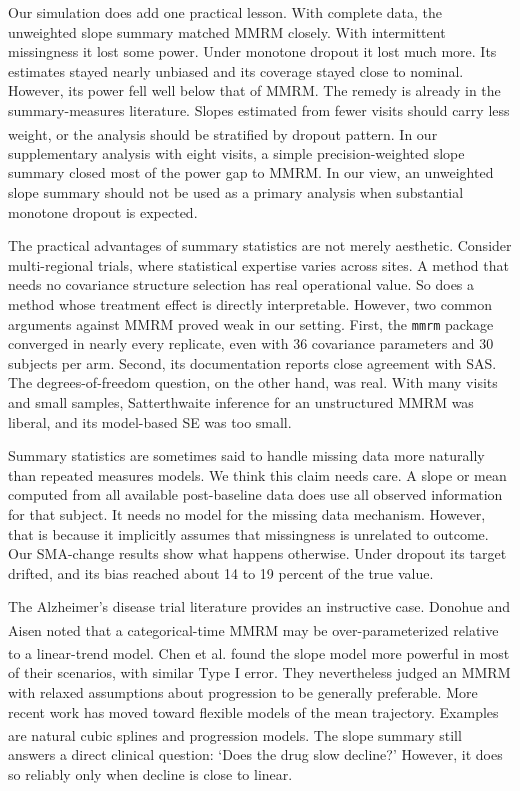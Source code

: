 \documentclass[
  11pt,
]{article}
\begin{document}
Our simulation does add one practical lesson. With complete
data, the unweighted slope summary matched MMRM closely. With
intermittent missingness it lost some power. Under monotone
dropout it lost much more. Its
estimates stayed nearly unbiased and its coverage stayed close
to nominal. However, its power fell well below that of MMRM.
The remedy is already in the summary-measures literature.
Slopes estimated from fewer visits should carry less weight,
or the analysis should be stratified by dropout pattern\textsuperscript{}. In our
supplementary analysis with eight visits, a simple
precision-weighted slope summary closed most of the power gap
to MMRM. In our view, an
unweighted slope summary should not be used as a primary
analysis when substantial monotone dropout is expected.

The practical advantages of summary statistics are not merely
aesthetic. Consider multi-regional trials, where statistical
expertise varies across sites. A method that needs no
covariance structure selection has real operational value. So
does a method whose treatment effect is directly
interpretable. However, two common arguments against MMRM
proved weak in our setting. First, the \texttt{mmrm} package
converged in nearly every replicate, even with 36 covariance
parameters and 30 subjects per arm. Second, its documentation
reports close agreement with SAS. The degrees-of-freedom
question, on the other hand, was real. With many visits and
small samples, Satterthwaite inference for an unstructured
MMRM was liberal, and its model-based SE was too small.

Summary statistics are sometimes said to handle missing data
more naturally than repeated measures models. We think this
claim needs care. A slope or mean computed from all available
post-baseline data does use all observed information for that
subject. It needs no model for the missing data mechanism.
However, that is because it implicitly assumes that missingness
is unrelated to outcome. Our SMA-change results
show what happens otherwise. Under dropout its target drifted,
and its bias reached about 14 to 19 percent of the true value.

The Alzheimer's disease trial literature provides an
instructive case. Donohue and Aisen\textsuperscript{} noted that a
categorical-time MMRM may be over-parameterized relative to a
linear-trend model. Chen et al.\textsuperscript{} found the
slope model more powerful in most of their scenarios, with
similar Type I error. They nevertheless judged an MMRM with
relaxed assumptions about progression to be generally
preferable. More recent work has moved toward flexible models
of the mean trajectory. Examples are natural cubic splines\textsuperscript{} and progression models\textsuperscript{}. The slope summary still answers
a direct clinical question: `Does the drug slow decline?'
However, it does so reliably only when decline is close to
linear.
\end{document}
